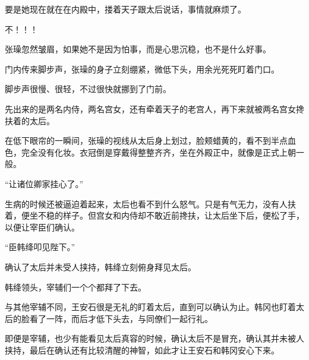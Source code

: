 要是她现在就在在内殿中，搂着天子跟太后说话，事情就麻烦了。

不！！！

张璪忽然皱眉，如果她不是因为怕事，而是心思沉稳，也不是什么好事。

门内传来脚步声，张璪的身子立刻绷紧，微低下头，用余光死死盯着门口。

脚步声很慢、很轻，不过很快就挪到了门前。

先出来的是两名内侍，两名宫女，还有牵着天子的老宫人，再下来就被两名宫女搀扶着的太后。

在低下眼帘的一瞬间，张璪的视线从太后身上划过，脸颊蜡黄的，看不到半点血色，完全没有化妆。衣冠倒是穿戴得整整齐齐，坐在外殿正中，就像是正式上朝一般。

“让诸位卿家挂心了。”

生病的时候还被逼迫着起来，太后也看不到什么怒气。只是有气无力，没有人扶着，便坐不稳的样子。但宫女和内侍却不敢近前搀扶，让太后坐下后，便松了手，以便让宰臣们确认。

“臣韩绛叩见陛下。”

确认了太后并未受人挟持，韩绛立刻俯身拜见太后。

韩绛领头，宰辅们一个个都拜了下去。

与其他宰辅不同，王安石很是无礼的盯着太后，直到可以确认为止。韩冈也盯着太后的脸看了一阵，而后才低下头去，与同僚们一起行礼。

即便是宰辅，也少有能看见太后真容的时候，确认太后不是冒充，确认其并未被人挟持，最后在确认还有比较清醒的神智，如此才让王安石和韩冈安心下来。
